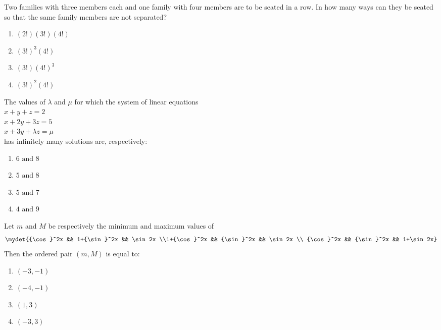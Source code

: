 \item  Two families with three members each and one family with four members are to be seated in a row. In how many ways can they be seated so that the same family members are not separated?\hfill{}
\begin{multicols}{4}
\begin{enumerate}
\item $(2!) (3!) (4!)$
\item $(3!)^3 (4!)$
\item $ (3!)(4!)^3$
\item $(3!)^2 (4!)$
\end{enumerate}
\end{multicols}

\item  The values of $\lambda$ and $\mu$ for which the system of linear equations\\
$x+y+z = 2$\\
$x+2y+3z = 5$\\
$x+3y+\lambda z = \mu$\\
has infinitely many solutions are, respectively:\hfill{}
\begin{multicols}{4}
\begin{enumerate}
\item $6 \text{ and } 8$
\item $5 \text{ and } 8$
\item $5 \text{ and } 7$
\item $4 \text{ and } 9$
\end{enumerate}
\end{multicols}

\item  Let $m$ and $M$ be respectively the minimum and maximum values of 
\begin{align*}
    \mydet{{\cos}^2x && 1+{\sin}^2x && \sin2x \\1+{\cos}^2x && {\sin}^2x && \sin2x \\ {\cos}^2x && {\sin}^2x && 1+\sin2x}
\end{align*}
Then the ordered pair $(m, M)$ is equal to:\hfill{}
\begin{multicols}{4}
\begin{enumerate}
\item $(-3, -1)$
\item $(-4, -1)$
\item $(1, 3)$
\item $(-3, 3)$
\end{enumerate}
\end{multicols}

